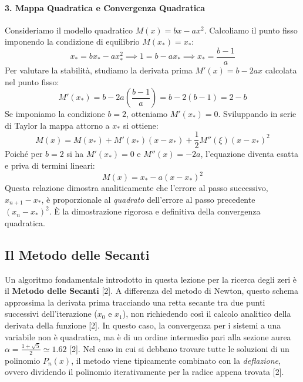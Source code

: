 \documentclass[12pt,a4paper]{article}
\begin{document}
\paragraph{3. Mappa Quadratica e Convergenza Quadratica}
Consideriamo il modello quadratico $M(x) = bx - ax^2$. Calcoliamo il punto fisso imponendo la condizione di equilibrio $M(x_*) = x_*$:
\begin{equation}
x_* = bx_* - ax_*^2 \implies 1 = b - ax_* \implies x_* = \frac{b-1}{a}
\end{equation}
Per valutare la stabilità, studiamo la derivata prima $M'(x) = b - 2ax$ calcolata nel punto fisso:
\begin{equation}
M'(x_*) = b - 2a\left(\frac{b-1}{a}\right) = b - 2(b-1) = 2 - b
\end{equation}
Se imponiamo la condizione $b=2$, otteniamo $M'(x_*) = 0$. Sviluppando in serie di Taylor la mappa attorno a $x_*$ si ottiene:
\begin{equation}
M(x) = M(x_*) + M'(x_*)(x-x_*) + \frac{1}{2}M''(\xi)(x-x_*)^2
\end{equation}
Poiché per $b=2$ si ha $M'(x_*)=0$ e $M''(x) = -2a$, l'equazione diventa esatta e priva di termini lineari:
\begin{equation}
M(x) = x_* - a(x-x_*)^2
\end{equation}
Questa relazione dimostra analiticamente che l'errore al passo successivo, $x_{n+1} - x_*$, è proporzionale al \textit{quadrato} dell'errore al passo precedente $(x_n - x_*)^2$. È la dimostrazione rigorosa e definitiva della convergenza quadratica.

\subsection{Il Metodo delle Secanti}
Un algoritmo fondamentale introdotto in questa lezione per la ricerca degli zeri è il \textbf{Metodo delle Secanti} [2]. A differenza del metodo di Newton, questo schema approssima la derivata prima tracciando una retta secante tra due punti successivi dell'iterazione ($x_0$ e $x_1$), non richiedendo così il calcolo analitico della derivata della funzione [2]. 
In questo caso, la convergenza per i sistemi a una variabile non è quadratica, ma è di un ordine intermedio pari alla sezione aurea $\alpha = \frac{1+\sqrt{5}}{2} \simeq 1.62$ [2]. Nel caso in cui si debbano trovare tutte le soluzioni di un polinomio $P_n(x)$, il metodo viene tipicamente combinato con la \textit{deflazione}, ovvero dividendo il polinomio iterativamente per la radice appena trovata [2].
\end{document}
